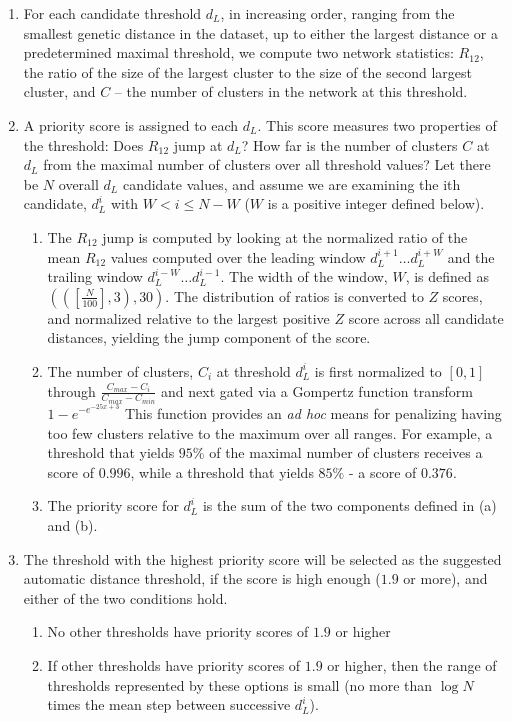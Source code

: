 \documentclass[utf8]{FrontiersinHarvard} %
\newcommand{\TODO}[1]{{\color{red}{#1}}}
\begin{document}
\begin{enumerate}
  \item{For each candidate threshold $d_L$, in increasing order, ranging from the smallest genetic distance in the dataset, up to either the largest distance or a predetermined maximal threshold, we compute two network statistics: $R_{12}$, the ratio of the size of the largest cluster to the size of the second largest cluster, and $C$ – the number of clusters in the network at this threshold.}

  \item{ A priority score is assigned to each $d_L$. This score measures two properties of the threshold: Does $R_{12}$ jump at $d_L$? How far is the number of clusters $C$ at $d_L$ from the maximal number of clusters over all threshold values? Let there be $N$ overall $d_L$ candidate values, and assume we are examining the ith candidate, $d_L^i$ with $W < i \leq N - W$ ($W$ is a positive integer defined below).

  \begin{enumerate}
    \item{The $R_{12}$ jump is computed by looking at the normalized ratio of the mean $R_{12}$ values computed over the leading window $d_L^{i+1}…d_L^{i+W}$ and the trailing window $d_L^{i-W}… d_L^{i-1}$. The width of the window, $W$, is defined as $(([\frac{N}{100}],3),30)$.\TODO{HV: I'm not entirely clear on how the width of the window is calculated. If N=50, then W becomes ((0.5, 3), 30). How do you get a single integer W from that?} The distribution of ratios is converted to $Z$ scores, and normalized relative to the largest positive $Z$ score across all candidate distances, yielding the jump component of the score.}
    \item{The number of clusters, $C_i$ at threshold $d_L^i$ is first normalized to $[0,1]$ through $\frac{{C_{max} - C_i}}{{C_{max} -C_{min}}}$ and next gated via a Gompertz function transform ${1-e}^{-e^{-25x+3}}$ This function provides an \emph{ad hoc} means for penalizing having too few clusters relative to the maximum over all ranges. For example, a threshold that yields $95\%$ of the maximal number of clusters receives a score of $0.996$, while a threshold that yields $85\%$ - a score of $0.376$.}
    \item{The priority score for $d_L^i$ is the sum of the two components defined in (a) and (b).}
  \end{enumerate}}


  \item{The threshold with the highest priority score will be selected as the suggested automatic distance threshold, if the score is high enough ($1.9$ or more), and either of the two conditions hold.
    \begin{enumerate}
      \item{No other thresholds have priority scores of $1.9$ or higher}
      \item{If other thresholds have priority scores of $1.9$ or higher, then the range of thresholds represented by these options is small (no more than $\log N$ times the mean step between successive $d_L^i$).}
    \end{enumerate}}


\end{enumerate}
\end{document}
